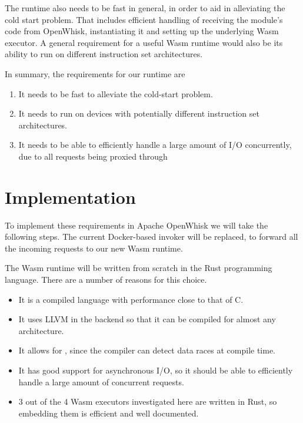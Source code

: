 
The runtime also needs to be fast in general, in order to aid in alleviating the cold start problem. That includes efficient handling of receiving the module's code from OpenWhisk, instantiating it and setting up the underlying Wasm executor. A general requirement for a useful Wasm runtime would also be its ability to run on different instruction set architectures.

In summary, the requirements for our runtime are

\begin{enumerate}
    \item It needs to be fast to alleviate the cold-start problem.
    \item It needs to run on devices with potentially different instruction set architectures.
    \item It needs to be able to efficiently handle a large amount of I/O concurrently, due to all requests being proxied through
\end{enumerate}

\section{Implementation}

To implement these requirements in Apache OpenWhisk we will take the following steps. The current Docker-based invoker will be replaced, to forward all the incoming requests to our new Wasm runtime.

The Wasm runtime will be written from scratch in the Rust programming language. There are a number of reasons for this choice.

\begin{itemize}
  \item It is a compiled language with performance close to that of C.
  \item It uses LLVM in the backend so that it can be compiled for almost any architecture.
  \item It allows for , since the compiler can detect data races at compile time.
  \item It has good support for asynchronous I/O, so it should be able to efficiently handle a large amount of concurrent requests.
  \item 3 out of the 4 Wasm executors investigated here are written in Rust, so embedding them is efficient and well documented.
\end{itemize}

